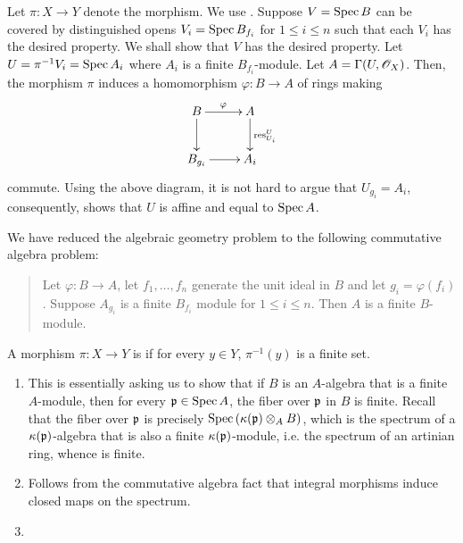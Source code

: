 \begin{exercise} %
    Let $\pi: X\to Y$ denote the morphism. We use . Suppose $V = \operatorname{Spec} B$ can be covered by distinguished opens $V_i = \operatorname{Spec} B_{f_i}$ for $1\le i\le n$ such that each $V_i$ has the desired property. We shall show that $V$ has the desired property. Let $U = \pi^{-1}V_i = \operatorname{Spec} A_i$ where $A_i$ is a finite $B_{f_i}$-module. Let $A = \Gamma(U, \mathscr{O}_X)$. Then, the morphism $\pi$ induces a homomorphism $\varphi: B\to A$ of rings making 
    \begin{equation*}
        \xymatrix {
            B\ar[r]^\varphi\ar[d] & A\ar[d]^{\res^{U}_{U_i}}\\
            B_{g_i}\ar[r] & A_i
        }
    \end{equation*}
    commute. Using the above diagram, it is not hard to argue that $U_{g_i} = A_i$, consequently,  shows that $U$ is affine and equal to $\operatorname{Spec} A$. 

    We have reduced the algebraic geometry problem to the following commutative algebra problem: 
    \begin{quote}
        Let $\varphi: B\to A$, let $f_1,\dots, f_n$ generate the unit ideal in $B$ and let $g_i = \varphi(f_i)$. Suppose $A_{g_i}$ is a finite $B_{f_i}$ module for $1\le i\le n$. Then $A$ is a finite $B$-module.
    \end{quote}
\end{exercise}

\begin{definition}
    A morphism $\pi: X\to Y$ is  if for every $y\in Y$, $\pi^{-1}(y)$ is a finite set.
\end{definition}

\begin{exercise}\hfill %
\begin{enumerate}[label=(\alph*)]
    \item This is essentially asking us to show that if $B$ is an $A$-algebra that is a finite $A$-module, then for every $\mathfrak{p}\in\operatorname{Spec} A$, the fiber over $\mathfrak{p}$ in $B$ is finite. Recall that the fiber over $\mathfrak{p}$ is precisely $\operatorname{Spec}\left(\kappa(\mathfrak{p})\otimes_A B\right)$, which is the spectrum of a $\kappa(\mathfrak{p})$-algebra that is also a finite $\kappa(\mathfrak{p})$-module, i.e. the spectrum of an artinian ring, whence is finite.

    \item Follows from the commutative algebra fact that integral morphisms induce closed maps on the spectrum.

    \item{}
\end{enumerate}
\end{exercise}

